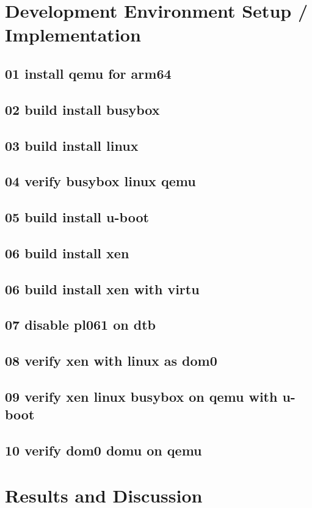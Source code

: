 \documentclass[acmtog]{acmart}
\begin{document}
\section{Development Environment Setup / Implementation}
\subsection{01 install qemu for arm64}
\subsection{02 build install busybox}
\subsection{03 build install linux}
\subsection{04 verify busybox linux qemu}
\subsection{05 build install u-boot}
\subsection{06 build install xen}
\subsection{06 build install xen with virtu}
\subsection{07 disable pl061 on dtb}
\subsection{08 verify xen with linux as dom0}
\subsection{09 verify xen linux busybox on qemu with u-boot}
\subsection{10 verify dom0 domu on qemu}



\section{Results and Discussion}
\end{document}
